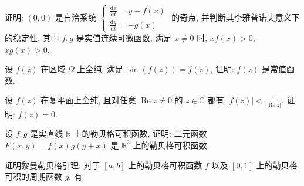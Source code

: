 证明: $(0,0)$ 是自洽系统 $\left\{ \begin{array}{l} \frac{\mathrm{d}x}{\mathrm{d}t} = y - f(x) \\ \frac{\mathrm{d}y}{\mathrm{d}t} = -g(x) \end{array} \right.$ 的奇点, 并判断其李雅普诺夫意义下的稳定性, 其中 $f, g$ 是实值连续可微函数, 满足 $x \neq 0$ 时, $xf(x) > 0$, $xg(x) > 0$.\par
设 $f(z)$ 在区域 $\Omega$ 上全纯, 满足 $\sin (f(z)) = f(z)$, 证明: $f(z)$ 是常值函数.\par
设 $f(z)$ 在复平面上全纯, 且对任意 $\operatorname{Re} z \neq 0$ 的 $z \in \mathbb{C}$ 都有 $|f(z)| < \frac{1}{|\operatorname{Re} z|}$. 证明: $f(z) = 0$.\par
设 $f, g$ 是实直线 $\mathbb{R}$ 上的勒贝格可积函数, 证明: 二元函数 $F(x, y) = f(x)g(y + x)$ 是 $\mathbb{R}^2$ 上的勒贝格可积函数.\par
\par{}
证明黎曼勒贝格引理: 对于 $[a, b]$ 上的勒贝格可积函数 $f$ 以及 $[0, 1]$ 上的勒贝格可积的周期函数 $g$, 有\par
\nopagebreak[4]
